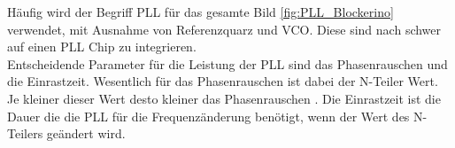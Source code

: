 Häufig wird der Begriff PLL für das gesamte Bild \ref{fig:PLL_Blockerino} verwendet, mit Ausnahme von Referenzquarz und VCO. Diese sind nach \cite[S.10]{PLL_Perf} schwer auf einen PLL Chip zu integrieren.\\
Entscheidende Parameter für die Leistung der PLL sind das Phasenrauschen und die Einrastzeit. Wesentlich für das Phasenrauschen ist dabei der N-Teiler Wert. Je kleiner dieser Wert desto kleiner das Phasenrauschen \cite[S.10]{PLL_Perf} . Die Einrastzeit ist die Dauer die die PLL für die Frequenzänderung benötigt, wenn der Wert des N-Teilers geändert wird.
